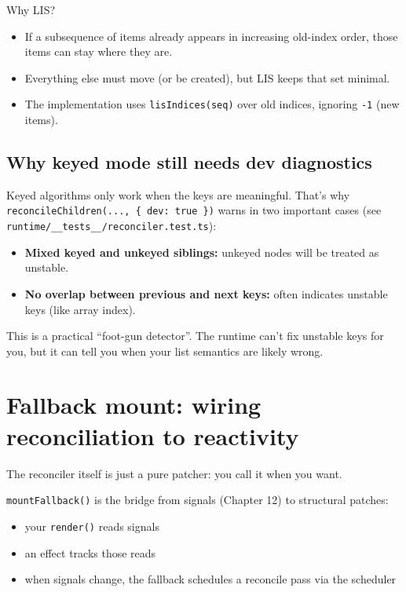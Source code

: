 Why LIS?

\begin{itemize}
  \item If a subsequence of items already appears in increasing old-index order, those items can stay where they are.
  \item Everything else must move (or be created), but LIS keeps that set minimal.
  \item The implementation uses \texttt{lisIndices(seq)} over old indices, ignoring \texttt{-1} (new items).
\end{itemize}

\subsection{Why keyed mode still needs dev diagnostics}

Keyed algorithms only work when the keys are meaningful.
That’s why \texttt{reconcileChildren(..., \{ dev: true \})} warns in two important cases
(see \texttt{runtime/\_\_tests\_\_/reconciler.test.ts}):

\begin{itemize}
  \item \textbf{Mixed keyed and unkeyed siblings:} unkeyed nodes will be treated as unstable.
  \item \textbf{No overlap between previous and next keys:} often indicates unstable keys (like array index).
\end{itemize}

This is a practical “foot-gun detector”.
The runtime can’t fix unstable keys for you, but it can tell you when your list semantics are likely wrong.

\section{Fallback mount: wiring reconciliation to reactivity}

The reconciler itself is just a pure patcher: you call it when you want.

	\texttt{mountFallback()} is the bridge from signals (Chapter 12) to structural patches:

\begin{itemize}
  \item your \texttt{render()} reads signals
  \item an effect tracks those reads
  \item when signals change, the fallback schedules a reconcile pass via the scheduler
\end{itemize}

